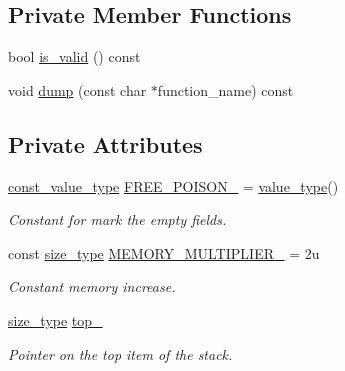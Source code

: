 \subsection*{Private Member Functions}
\begin{DoxyCompactItemize}
\item 
bool \hyperlink{classstk_1_1stack__t_a981df1d2676a6253d943c8b42db6e8f0}{is\+\_\+valid} () const
\item 
void \hyperlink{classstk_1_1stack__t_a5b880836e779c81052eb82e7f435ab54}{dump} (const char $\ast$function\+\_\+name) const
\end{DoxyCompactItemize}
\subsection*{Private Attributes}
\begin{DoxyCompactItemize}
\item 
\mbox{\label{classstk_1_1stack__t_aeaff281674605712b238b9d482b0d395}} 
\hyperlink{classstk_1_1stack__t_a0beb74f603c2354cb9af98ee65801ce7}{const\+\_\+value\+\_\+type} \hyperlink{classstk_1_1stack__t_aeaff281674605712b238b9d482b0d395}{F\+R\+E\+E\+\_\+\+P\+O\+I\+S\+O\+N\+\_\+} = \hyperlink{classstk_1_1stack__t_a2e10db77beb285902df2b32f30209067}{value\+\_\+type}()
\begin{DoxyCompactList}\small\item\em Constant for mark the empty fields. \end{DoxyCompactList}\item 
\mbox{\label{classstk_1_1stack__t_a72607554a016dbb0e6b5cc92accdce03}} 
const \hyperlink{classstk_1_1stack__t_a591d5ffc540c9f27e5618f9aa4d67cad}{size\+\_\+type} \hyperlink{classstk_1_1stack__t_a72607554a016dbb0e6b5cc92accdce03}{M\+E\+M\+O\+R\+Y\+\_\+\+M\+U\+L\+T\+I\+P\+L\+I\+E\+R\+\_\+} = 2u
\begin{DoxyCompactList}\small\item\em Constant memory increase. \end{DoxyCompactList}\item 
\mbox{\label{classstk_1_1stack__t_aa26173e9f9fe76e7e28ca71b1e17c9ef}} 
\hyperlink{classstk_1_1stack__t_a591d5ffc540c9f27e5618f9aa4d67cad}{size\+\_\+type} \hyperlink{classstk_1_1stack__t_aa26173e9f9fe76e7e28ca71b1e17c9ef}{top\+\_\+}
\begin{DoxyCompactList}\small\item\em Pointer on the top item of the stack. \end{DoxyCompactList}\item 

\end{DoxyCompactItemize}
